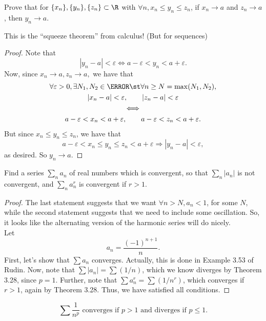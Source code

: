\documentclass{assignment}
\begin{document}
\begin{question}[2]
  Prove that for $\{x_n\}, \{y_n\}, \{z_n\} \subset \R$ with $\forall n, x_n \leq y_n \leq z_n$, if
$x_n \to a$ and $z_n \to a$, then $y_n \to a$.
\end{question}
This is the ``squeeze theorem'' from calculus! (But for sequences)
\begin{proof}
 Note that $$|y_n - a| < \varepsilon \iff a - \varepsilon < y_n < a + \varepsilon.$$ Now, since $x_n
 \to a, z_n \to a,$ we have that 
 \begin{gather*}
   \forall \varepsilon > 0, \exists N_1, N_2 \in \N \st \forall n \geq N = \max(N_1, N_2), \\
   |x_n - a| < \varepsilon, \qquad |z_n - a| < \varepsilon  \\ \iff \\
   a - \varepsilon < x_n < a + \varepsilon, \qquad a - \varepsilon < z_n < a + \varepsilon.
 \end{gather*}
 But since $x_n \leq y_n \leq z_n$, we have that $$a - \varepsilon < x_n \leq y_n \leq z_n < a +
 \varepsilon \Rightarrow |y_n - a| < \varepsilon,$$ as desired. So $y_n \to a$.
\end{proof}

\begin{question}[3]
  Find a series $\sum_n a_n$ of real numbers which is convergent, so that $\sum_n |a_n|$ is not convergent,
and $\sum_n a_n^r$ is convergent if $r > 1$.
\end{question}
\begin{proof}
  The last statement suggests that we want $\forall n > N, a_n < 1$, for some $N$, while the second 
statement suggests that we need to include some oscillation. So, it looks like the alternating version 
of the harmonic series will do nicely. \\

Let $$a_n = \frac{(-1)^{n+1}}{n}.$$ First, let's show that $\sum a_n$ converges. Actually, this is 
done in Example 3.53 of Rudin. Now, note that $\sum|a_n| = \sum (1/n)$, which we know diverges by
Theorem 3.28, since $p = 1$. Further, note that $\sum a_n^r = \sum (1 / n^r)$, which converges if 
$r > 1$, again by Theorem 3.28. Thus, we have satisfied all conditions.
\end{proof}
\begin{question}[Theorem 3.28]
  $$\sum \frac{1}{n^p} \text{ converges if } p > 1 \text{ and diverges if } p \leq 1.$$ 
\end{question}
\end{document}
